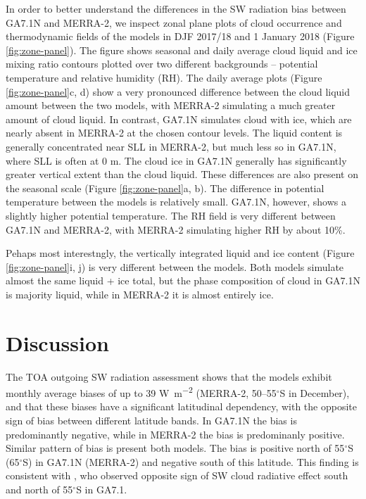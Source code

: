 In order to better understand the differences in the SW radiation bias between
GA7.1N and MERRA-2, we inspect zonal plane plots of cloud occurrence and
thermodynamic fields of the models in DJF 2017/18 and 1 January 2018 (Figure
\ref{fig:zone-panel}). The figure shows seasonal and daily average cloud liquid
and ice mixing ratio contours plotted over two different backgrounds --
potential temperature and relative humidity (RH). The daily average plots
(Figure \ref{fig:zone-panel}c, d) show a very pronounced difference between
the cloud liquid amount between the two models, with MERRA-2 simulating a much
greater amount of cloud liquid. In contrast, GA7.1N simulates cloud with ice,
which are nearly absent in MERRA-2 at the chosen contour levels. The liquid
content is generally concentrated near SLL in MERRA-2, but much less so in GA7.1N,
where SLL is often at 0 m. The cloud ice in GA7.1N generally has significantly
greater vertical extent than the cloud liquid. These differences are also
present on the seasonal scale (Figure \ref{fig:zone-panel}a, b). The difference
in potential temperature between the models is relatively small. GA7.1N, however,
shows a slightly higher potential temperature.
The RH field is very different between GA7.1N and MERRA-2, with MERRA-2
simulating higher RH by about 10\%.

Pehaps most interestngly, the vertically integrated liquid and ice content
(Figure \ref{fig:zone-panel}i, j) is very different between the models. Both
models simulate almost the same liquid + ice total, but the phase composition
of cloud in GA7.1N is majority liquid, while in MERRA-2 it is almost entirely
ice.

\section{Discussion}

The TOA outgoing SW radiation assessment shows that the models exhibit monthly
average biases of up to 39 \unit{W m^{-2}} (MERRA-2, 50--55$^\circ$S in
December), and that these biases have a significant latitudinal dependency,
with the opposite sign of bias between different latitude bands. In GA7.1N the
bias is predominantly negative, while in MERRA-2 the bias is predominanly
positive. Similar pattern of bias is present both models. The bias is positive
north of 55$^\circ$S (65$^\circ$S) in GA7.1N (MERRA-2) and negative south of
this latitude.
This finding is consistent with \cite{schuddeboom2019}, who observed opposite
sign of SW cloud radiative effect south and north of 55$^\circ$S in GA7.1.

